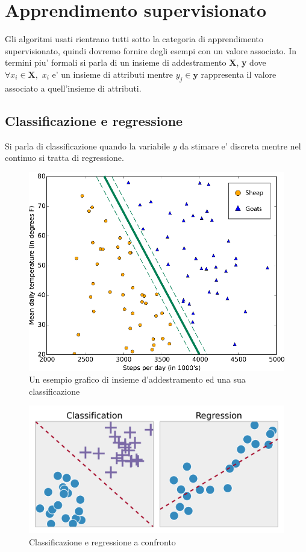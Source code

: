 \section*{Apprendimento supervisionato}
Gli algoritmi usati rientrano tutti sotto la categoria di apprendimento supervisionato, quindi dovremo fornire degli esempi con un valore associato. In termini piu' formali si parla di un insieme di addestramento \textbf{X}, \textbf{y} dove $\forall x_i \in \textbf{X},\,\,x_i$ e' un insieme di attributi mentre $y_j \in \textbf{y}$ rappresenta il valore associato a quell'insieme di attributi.

\subsection*{Classificazione e regressione}
Si parla di classificazione quando la variabile $y$ da stimare e' discreta mentre nel continuo si tratta di regressione.

\begin{figure}[H]
	\centering
	\includegraphics[width=0.7\linewidth]{img/supervised_learning_example}
	\caption{Un esempio grafico di insieme d'addestramento ed una sua classificazione}
	\label{fig:supervisedlearningexample}
\end{figure}


\begin{figure}[H]
	\centering
	\includegraphics[width=0.7\linewidth]{img/Classification_Regression}
	\caption{Classificazione e regressione a confronto}
	\label{fig:classificationregression}
\end{figure}

